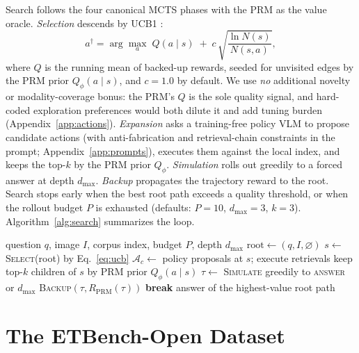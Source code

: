 \documentclass[letterpaper,twocolumn,10pt]{article}
\newcommand{\ours}{EvidenceTree}
\newcommand{\dataset}{ETBench-Open}
\begin{document}
Search follows the four canonical MCTS phases with the PRM as the value
oracle. \emph{Selection} descends by UCB1
\cite{auer2002ucb,kocsis2006uct}:
\begin{equation}
a^{\dagger} = \arg\max_{a}\;
Q(a \mid s) \;+\; c\, \sqrt{ \frac{\ln N(s)}{N(s, a)} },
\label{eq:ucb}
\end{equation}
where $Q$ is the running mean of backed-up rewards, seeded for unvisited
edges by the PRM prior $Q_{\phi}(a \mid s)$, and $c = 1.0$ by default. We use \emph{no} additional
novelty or modality-coverage bonus: the PRM's $Q$ is the sole quality
signal, and hard-coded exploration preferences would both dilute it and add
tuning burden (Appendix~\ref{app:actions}). \emph{Expansion} asks a
training-free policy VLM to propose candidate actions (with
anti-fabrication and retrieval-chain constraints in the prompt;
Appendix~\ref{app:prompts}), executes them against the local index, and
keeps the top-$k$ by the PRM prior $Q_{\phi}$. \emph{Simulation} rolls out greedily to a
forced answer at depth $d_{\max}$. \emph{Backup} propagates the trajectory
reward to the root. Search stops early when the best root path exceeds a
quality threshold, or when the rollout budget $P$ is exhausted (defaults:
$P{=}10$, $d_{\max}{=}3$, $k{=}3$). Algorithm~\ref{alg:search} summarizes
the loop.

\begin{algorithm}[t]
\caption{\ours{} inference}
\label{alg:search}
\begin{algorithmic}[1]
\Require question $q$, image $I$, corpus index, budget $P$, depth $d_{\max}$
\State $\mathrm{root} \gets (q, I, \varnothing)$
  \State $s \gets$ \textsc{Select}(root) by Eq.~\eqref{eq:ucb}
  \State $\mathcal{A}_c \gets$ policy proposals at $s$; execute retrievals
  \State keep top-$k$ children of $s$ by PRM prior $Q_{\phi}(a \mid s)$
  \State $\tau \gets$ \textsc{Simulate} greedily to \textsc{answer} or $d_{\max}$
  \State \textsc{Backup}$(\tau, R_\mathrm{PRM}(\tau))$
   \textbf{break}
  \EndIf
\EndFor
\State \Return answer of the highest-value root path
\end{algorithmic}
\end{algorithm}

\section{The \dataset{} Dataset}
\label{sec:dataset}
\end{document}

